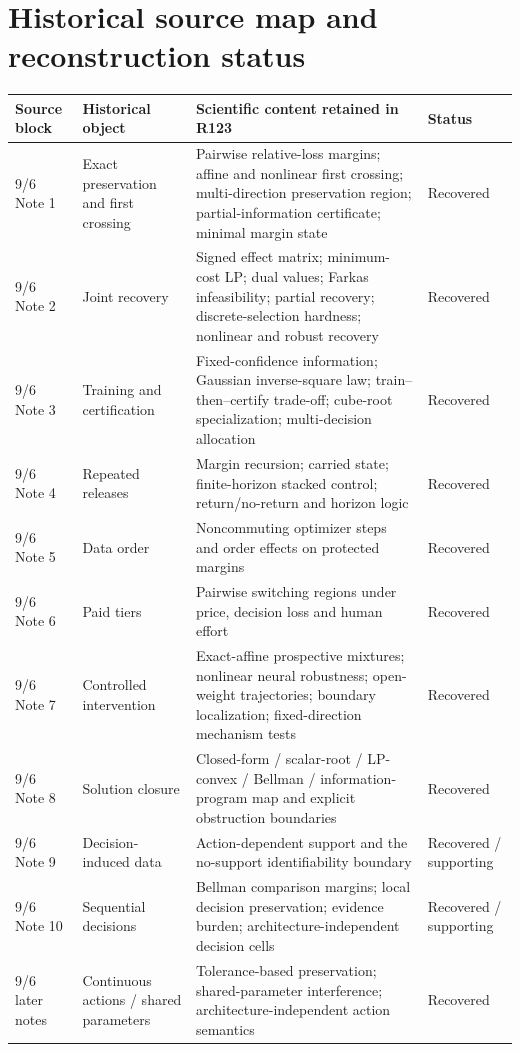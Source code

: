 \documentclass[11pt,letterpaper]{article}
\theoremstyle{plain}
\newcommand{\1}{\mathbf 1}
\begin{document}
\section{Historical source map and reconstruction status}
\footnotesize
\begin{longtable}{p{}p{}p{}p{}}
\toprule
Source block & Historical object & Scientific content retained in R123 & Status\\\midrule
9/6 Note 1 & Exact preservation and first crossing & Pairwise relative-loss margins; affine and nonlinear first crossing; multi-direction preservation region; partial-information certificate; minimal margin state & Recovered\\
9/6 Note 2 & Joint recovery & Signed effect matrix; minimum-cost LP; dual values; Farkas infeasibility; partial recovery; discrete-selection hardness; nonlinear and robust recovery & Recovered\\
9/6 Note 3 & Training and certification & Fixed-confidence information; Gaussian inverse-square law; train--then--certify trade-off; cube-root specialization; multi-decision allocation & Recovered\\
9/6 Note 4 & Repeated releases & Margin recursion; carried state; finite-horizon stacked control; return/no-return and horizon logic & Recovered\\
9/6 Note 5 & Data order & Noncommuting optimizer steps and order effects on protected margins & Recovered\\
9/6 Note 6 & Paid tiers & Pairwise switching regions under price, decision loss and human effort & Recovered\\
9/6 Note 7 & Controlled intervention & Exact-affine prospective mixtures; nonlinear neural robustness; open-weight trajectories; boundary localization; fixed-direction mechanism tests & Recovered\\
9/6 Note 8 & Solution closure & Closed-form / scalar-root / LP-convex / Bellman / information-program map and explicit obstruction boundaries & Recovered\\
9/6 Note 9 & Decision-induced data & Action-dependent support and the no-support identifiability boundary & Recovered / supporting\\
9/6 Note 10 & Sequential decisions & Bellman comparison margins; local decision preservation; evidence burden; architecture-independent decision cells & Recovered / supporting\\
9/6 later notes & Continuous actions / shared parameters & Tolerance-based preservation; shared-parameter interference; architecture-independent action semantics & Recovered\\

\end{longtable}
\end{document}
